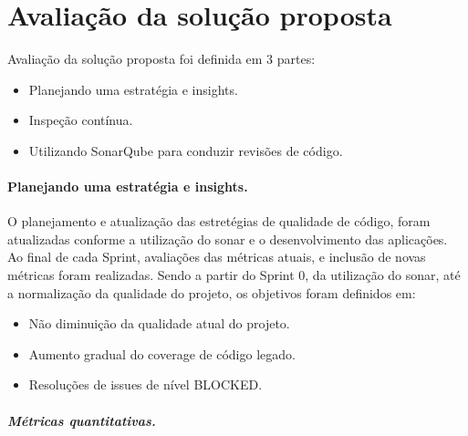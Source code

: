 \documentclass[12pt]{article}
\begin{document}
		
\part{Avaliação da solução proposta} \label{sec:avaliacao}
 Avaliação da solução proposta foi definida em 3 partes:
 
 \begin{itemize}
 	\item Planejando uma estratégia e insights.	
 	\item Inspeção contínua.
 	\item Utilizando SonarQube para conduzir revisões de código.
 \end{itemize}

\subsection{Planejando uma estratégia e insights.} \label{sec:sonar-planning}

O planejamento e atualização das estretégias de qualidade de código, foram atualizadas conforme a utilização do sonar e o desenvolvimento das aplicações.
Ao final de cada Sprint, avaliações das métricas atuais, e inclusão de novas métricas foram realizadas.
Sendo a partir do Sprint 0, da utilização do sonar, até a normalização da qualidade do projeto, os objetivos foram definidos em:

 \begin{itemize}
 	\item Não diminuição da qualidade atual do projeto.
 	\item Aumento gradual do coverage de código legado.
 	\item Resoluções de issues de nível BLOCKED.
 \end{itemize}

\subsubsection{Métricas quantitativas.} \label{sec:sonar-planning-mquantity}
\end{document}
